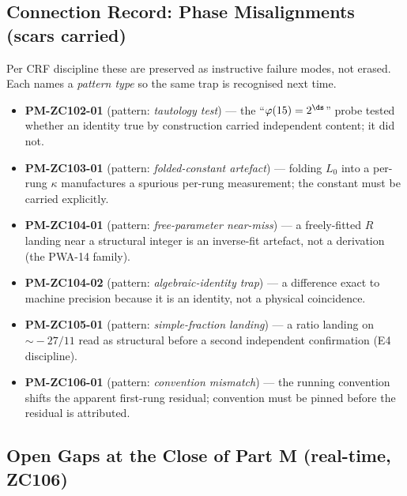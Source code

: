 \documentclass[12pt, a4paper]{article}
\begin{document}
\subsection{Connection Record: Phase Misalignments (scars carried)}

\begin{keybox}[title={Phase-Misalignment scars recorded in Part M}]
\sloppy
Per CRF discipline these are preserved as instructive failure modes, not
erased. Each names a \emph{pattern type} so the same trap is recognised next
time.
\begin{itemize}[leftmargin=1.4em,itemsep=2pt]
\item \textbf{PM-ZC102-01} (pattern: \emph{tautology test}) --- the
``$\varphi(15)=2^{\ds}$'' probe tested whether an identity true by
construction carried independent content; it did not.
\item \textbf{PM-ZC103-01} (pattern: \emph{folded-constant artefact}) ---
folding $L_0$ into a per-rung $\kappa$ manufactures a spurious per-rung
measurement; the constant must be carried explicitly.
\item \textbf{PM-ZC104-01} (pattern: \emph{free-parameter near-miss}) --- a
freely-fitted $R$ landing near a structural integer is an inverse-fit
artefact, not a derivation (the PWA-14 family).
\item \textbf{PM-ZC104-02} (pattern: \emph{algebraic-identity trap}) --- a
difference exact to machine precision because it is an identity, not a
physical coincidence.
\item \textbf{PM-ZC105-01} (pattern: \emph{simple-fraction landing}) --- a
ratio landing on $\sim\!-27/11$ read as structural before a second
independent confirmation (E4 discipline).
\item \textbf{PM-ZC106-01} (pattern: \emph{convention mismatch}) --- the
running convention shifts the apparent first-rung residual; convention must
be pinned before the residual is attributed.
\end{itemize}
\end{keybox}

\subsection{Open Gaps at the Close of Part M (real-time, ZC106)}
\end{document}
